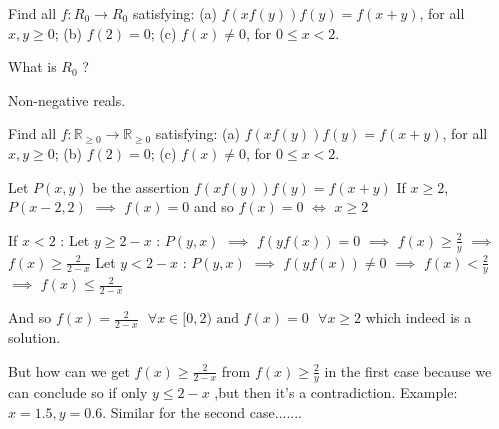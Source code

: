 \begin{solution}
	\begin{tcolorbox}Find all $f:R_0 \to R_0$ satisfying:
(a) $f(xf(y))f(y)=f(x+y)$, for all $x,y \ge 0$;
(b) $f(2)=0$;
(c) $f(x) \ne 0$, for $0 \le x < 2$.\end{tcolorbox}
What is $R_0$ ?
\end{solution}



\begin{solution}
	Non-negative reals.
\end{solution}



\begin{solution}
	\begin{tcolorbox}Find all $f:\mathbb R_{\ge 0} \to \mathbb R_{\ge 0}$ satisfying:
(a) $f(xf(y))f(y)=f(x+y)$, for all $x,y \ge 0$;
(b) $f(2)=0$;
(c) $f(x) \ne 0$, for $0 \le x < 2$.\end{tcolorbox}
Let $P(x,y)$ be the assertion $f(xf(y))f(y)=f(x+y)$
If $x\ge 2$, $P(x-2,2)$ $\implies$ $f(x)=0$ and so $f(x)=0$ $\iff$ $x\ge 2$

If $x<2$ : 
Let $y\ge 2-x$ : $P(y,x)$ $\implies$ $f(yf(x))=0$ $\implies$ $f(x)\ge \frac 2y$ $\implies$ $f(x)\ge \frac 2{2-x}$
Let $y < 2-x$ : $P(y,x)$ $\implies$ $f(yf(x))\ne 0$ $\implies$ $f(x)<\frac 2y$ $\implies$ $f(x)\le \frac 2{2-x}$

And so $\boxed{f(x)=\frac 2{2-x}\text{  }\forall x\in[0,2)\text{  and  }f(x)=0\text{  }\forall x\ge 2}$ which indeed is a solution.
\end{solution}



\begin{solution}
	But how can we get $f(x)\ge \frac{2}{2-x}$ from $f(x)\ge \frac{2}{y}$ in the first case because we can conclude so if only $y \le 2-x$ ,but then it's a contradiction. Example: $x=1.5, y=0.6$. 
Similar for the second case.......
\end{solution}



